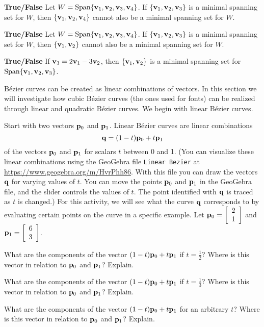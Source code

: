 \item \textbf{True/False} Let $W = \text{Span}\{\mathbf{v}_1, \mathbf{v}_2, \mathbf{v}_3, \mathbf{v}_4\}$. If $\{\mathbf{v}_1, \mathbf{v}_2, \mathbf{v}_3\}$ is a minimal spanning set for $W$, then $\{\mathbf{v}_1, \mathbf{v}_2, \mathbf{v}_4\}$ cannot also be a minimal spanning set for $W$.

\item \textbf{True/False} Let $W = \text{Span}\{\mathbf{v}_1, \mathbf{v}_2, \mathbf{v}_3, \mathbf{v}_4\}$. If $\{\mathbf{v}_1, \mathbf{v}_2, \mathbf{v}_3\}$ is a minimal spanning set for $W$, then $\{\mathbf{v}_1, \mathbf{v}_2\}$ cannot also be a minimal spanning set for $W$.

\item \textbf{True/False} If $\mathbf{v}_3=2\mathbf{v}_1-3\mathbf{v}_2$, then $\{\mathbf{v}_1, \mathbf{v}_2\}$ is a minimal spanning set for \\
$\text{Span}\{\mathbf{v}_1, \mathbf{v}_2, \mathbf{v}_3\}$.
\ea

\ee

\label{sec:proj_bezier}

B\'{e}zier curves can be created as linear combinations of vectors. In this section we will investigate how cubic B\'{e}zier curves (the ones used for fonts) can be realized through linear and quadratic B\'{e}zier curves. We begin with linear B\'{e}zier curves.

\begin{pactivity} \label{act:1_d_linear_Bezier} Start with two vectors $\mathbf{p}_0$ and $\mathbf{p}_1$. Linear B\'{e}zier curves are linear combinations 
\[\mathbf{q} = (1-t)\mathbf{p}_0 + t\mathbf{p}_1\]
of the vectors $\mathbf{p}_0$ and $\mathbf{p}_1$ for scalars $t$ between 0 and 1. (You can visualize these linear combinations using the GeoGebra file \texttt{Linear Bezier} at \url{https://www.geogebra.org/m/HvrPhh86}. With this file you can draw the vectors $\mathbf{q}$ for varying values of $t$. You can move the points $\mathbf{p}_0$ and $\mathbf{p}_1$ in the GeoGebra file, and the slider controls the values of $t$. The point identified with $\mathbf{q}$ is traced as $t$ is changed.)  For this activity, we will see what the curve $\mathbf{q}$ corresponds to by evaluating certain points on the curve in a specific example. Let $\mathbf{p}_0 = \left[ \begin{array}{c} 2 \\ 1 \end{array} \right]$ and $\mathbf{p}_1 = \left[ \begin{array}{c} 6 \\ 3 \end{array} \right]$. 
	\ba
	\item What are the components of the vector $(1-t)\mathbf{p}_0 + t\mathbf{p}_1$ if $t = \frac{1}{2}$? Where is this vector in relation to $\mathbf{p}_0$ and $\mathbf{p}_1$? Explain.


\item  What are the components of the vector $(1-t)\mathbf{p}_0 + t\mathbf{p}_1$ if $t = \frac{1}{3}$? Where is this vector in relation to $\mathbf{p}_0$ and $\mathbf{p}_1$? Explain.


\item What are the components of the vector $(1-t)\mathbf{p}_0 + t\mathbf{p}_1$ for an arbitrary $t$? Where is this vector in relation to $\mathbf{p}_0$ and $\mathbf{p}_1$? Explain. 


\ea

\end{pactivity}

